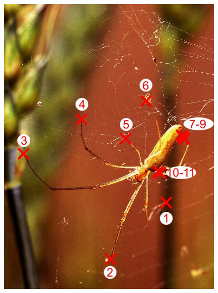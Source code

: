 \begin{figure}
{\includegraphics[scale=0.15]{figures/chapter3/grabcut-connectivity/cp-3.png}
}
\subfloat[]{
}
\end{figure}
